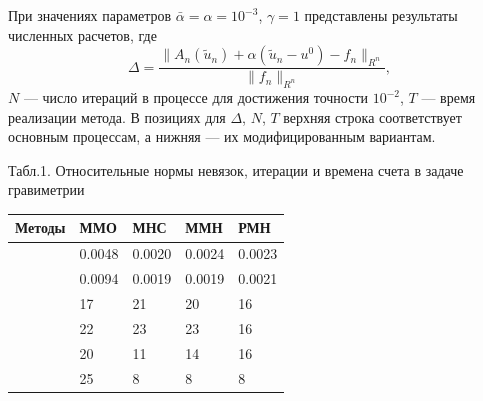 \documentclass[10pt,pdf, mathserif, hyperref={unicode}]{beamer}
\begin{document}
\begin{frame}
	При значениях параметров $\bar\alpha=\alpha=10^{-3}$, $\gamma=1$ представлены результаты численных расчетов, где
	$$\Delta=\frac{\|A_n(\tilde{u}_n)+\alpha(\tilde{u}_n-u^0)-f_n\|_{R^n}}{\|f_n\|_{R^n}},$$
	$N$ --- число итераций в процессе для достижения точности $10^{-2}$, $T$ --- время реализации метода. В позициях для $\Delta$, $N$, $T$ верхняя строка соответствует основным процессам, а нижняя --- их модифицированным вариантам.
	\begin{table}
		\centering
		{\scriptsize Табл.1. Относительные нормы невязок, итерации и времена счета в задаче гравиметрии}
		
		\begin{tabular}{|p{}|p{}|p{}|p{}|p{}|}
			\hline
			\rule{0cm}{0.5cm}
			Методы & ММО & МНС & ММН & РМН \\ \hline
			\rule{0cm}{0.5cm}
			\multirow{$\Delta$} & 0.0048 & 0.0020 & 0.0024 & 0.0023	 \\ \cline{2-5} 
			\rule{0cm}{0.5cm}
			&  0.0094   & 0.0019    &  0.0019   &  0.0021   \\ \hline
			\rule{0cm}{0.5cm}
			\multirow{$N$} & 17  &  21   &   20  &  16    \\ \cline{2-5}
			\rule{0cm}{0.5cm}
			&  22   &   23  &  23   &  16   \\ \hline
			\rule{0cm}{0.5cm}
			\multirow{$T$ (сек)}    &  20   &  11   &  14  & 16    \\ \cline{2-5}
			\rule{0cm}{0.5cm}
			& 25    & 8    &  8   &   8  \\ \hline
		\end{tabular}
	\end{table}
\end{frame}
\end{document}
